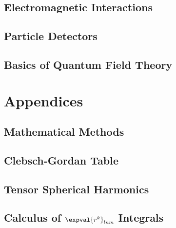 \documentclass[a4paper, 11pt]{book}
\newcommand{\1}{\opr{\mathds{1}}}
\begin{document}
	\chapter{Electromagnetic Interactions}
	
	\chapter{Particle Detectors}
	
	\chapter{Basics of Quantum Field Theory}
	
%	
%	
%		
\part{Appendices}
\appendix
	\chapter{Mathematical Methods}
		
	\chapter{Clebsch-Gordan Table}\label{app:cgt}
		
	\chapter{Tensor Spherical Harmonics}\label{app:tsh}
		
	\chapter{Calculus of $\expval{r^k}_{lnm}$ Integrals}
		
\end{document}
